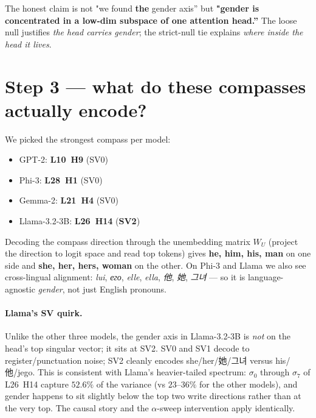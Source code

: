 \documentclass[11pt]{article}
\begin{document}
\begin{tcolorbox}[findbox]
The honest claim is not "we found \textbf{the} gender axis'' but
\textbf{"gender is concentrated in a low-dim subspace of one attention
head.''} The loose null justifies \emph{the head carries gender}; the
strict-null tie explains \emph{where inside the head it lives}.
\end{tcolorbox}

\section{Step 3 --- what do these compasses actually encode?}
We picked the strongest compass per model:
\begin{itemize}[leftmargin=*,nosep]
    \item GPT-2: \textbf{L10~H9} (SV0)
    \item Phi-3: \textbf{L28~H1} (SV0)
    \item Gemma-2: \textbf{L21~H4} (SV0)
    \item Llama-3.2-3B: \textbf{L26~H14} (\textbf{SV2})
\end{itemize}

Decoding the compass direction through the unembedding matrix $W_U$
(project the direction to logit space and read top tokens) gives
\textbf{he, him, his, man} on one side and \textbf{she, her, hers,
woman} on the other. On Phi-3 and Llama we also see cross-lingual
alignment: \emph{lui}, \emph{его}, \emph{elle}, \emph{ella}, \emph{他},
\emph{她}, \emph{그녀} --- so it is language-agnostic \emph{gender}, not
just English pronouns.

\paragraph{Llama's SV quirk.} Unlike the other three models, the gender
axis in Llama-3.2-3B is \emph{not} on the head's top singular vector;
it sits at SV2. SV0 and SV1 decode to register/punctuation noise; SV2
cleanly encodes she/her/她/그녀 versus his/他/jego. This is consistent
with Llama's heavier-tailed spectrum: $\sigma_0$ through $\sigma_7$ of
L26~H14 capture $52.6\%$ of the variance (vs $23\text{--}36\%$ for the
other models), and gender happens to sit slightly below the top two
write directions rather than at the very top. The causal story and the
$\alpha$-sweep intervention apply identically.
\end{document}

